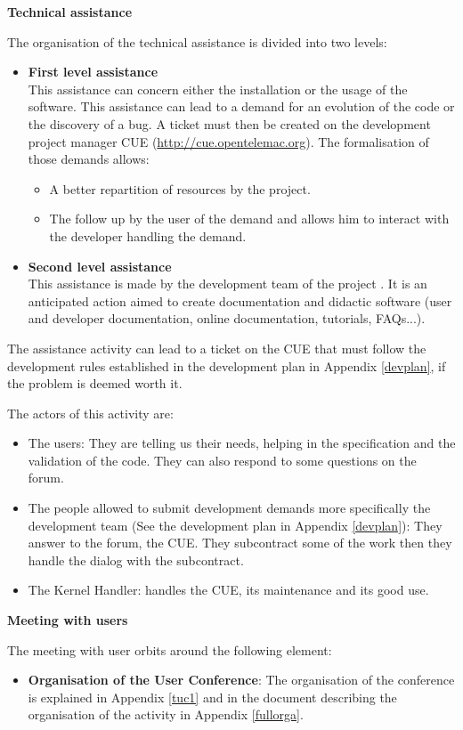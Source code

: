 \textbf{Technical assistance}

The organisation of the technical assistance is divided into two levels:
\begin{itemize}
\item \textbf{First level assistance}\\
This assistance can concern either the installation or the usage of the
software. This assistance can lead to a demand for an evolution of the code or
the discovery of a bug. A ticket must then be created on the development
project manager CUE (\url{http://cue.opentelemac.org}). The formalisation of
those demands allows:
\begin{itemize}
\item A better repartition of resources by the project.
\item The follow up by the user of the demand and allows him to interact with
the developer handling the demand.
\end{itemize}
\item \textbf{Second level assistance}\\
This assistance is made by the development team of the project \telemacsystem. It is an
anticipated action aimed to create documentation and didactic software (user
and developer documentation, online documentation, tutorials, FAQs...).
\end{itemize}

The assistance activity can lead to a ticket on the CUE that must follow the
development rules established in the development plan in Appendix
\ref{devplan}, if the problem is deemed worth it.

The actors of this activity are:
\begin{itemize}
\item The users: They are telling us their needs, helping in the specification and
the validation of the code. They can also respond to some questions on the
forum.
\item The people allowed to submit development demands more specifically the
development team (See the development plan in Appendix \ref{devplan}): They answer to
the forum, the CUE. They subcontract some of the work then they handle the
dialog with the subcontract.
\item The Kernel Handler: handles the CUE, its maintenance and its good use.
\end{itemize}

\textbf{Meeting with users}

The meeting with user orbits around the following element:
\begin{itemize}
\item \textbf{Organisation of the \telemacsystem User Conference}: The organisation of
the conference is explained in Appendix \ref{tuc1} and in the document
describing the organisation of the \telemacsystem activity in Appendix
\ref{fullorga}.
\end{itemize}

